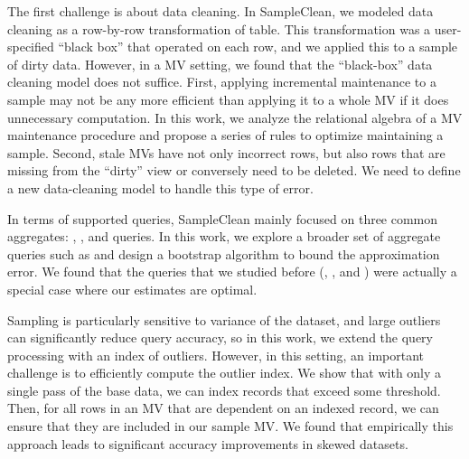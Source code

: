 The first challenge is about data cleaning. In SampleClean, we modeled data cleaning as a row-by-row transformation of table. 
This transformation was a user-specified  ``black box'' that operated on each row, and we applied this to a sample of dirty data.
However, in a MV setting, we found that the ``black-box'' data cleaning model does not suffice.
First, applying incremental maintenance to a sample may not be any more efficient than applying it to a whole MV if it does unnecessary computation.
In this work, we analyze the relational algebra of a MV maintenance procedure and propose a series of rules to optimize maintaining a sample.
Second, stale MVs have not only incorrect rows, but also rows that are missing from the ``dirty'' view or conversely need to be deleted. We need to define a new data-cleaning model to handle this type of error. 

In terms of supported queries, SampleClean mainly focused on three common aggregates: \sumfunc, \avgfunc, and \countfunc queries.
In this work, we explore a broader set of aggregate queries such as \medfunc and design a bootstrap algorithm to bound the approximation error.
We found that the queries that we studied before (\sumfunc, \avgfunc, and \countfunc) were actually a special case where our estimates are optimal.

Sampling is particularly sensitive to variance of the dataset, and large outliers can significantly reduce query accuracy, so in this work, we extend the query processing with an index of outliers.
However, in this setting, an important challenge is to efficiently compute the outlier index.
We show that with only a single pass of the base data, we can index records that exceed some threshold.
Then, for all rows in an MV that are dependent on an indexed record, we can ensure that they are included in our sample MV.
We found that empirically this approach leads to significant accuracy improvements in skewed datasets.

